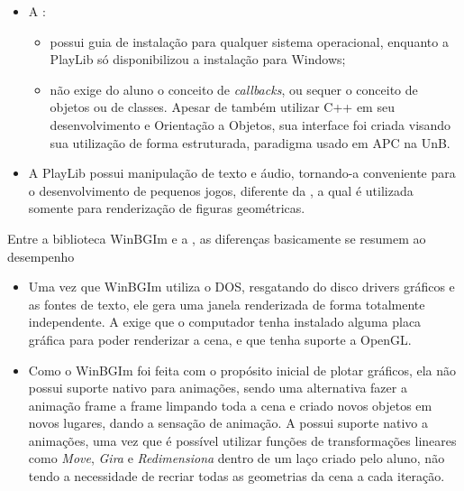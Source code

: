  \begin{itemize}
    \item A \playAPC:
    \begin{itemize}
        \item possui guia  de instalação  para qualquer  sistema
   operacional, enquanto a PlayLib  só disponibilizou a instalação para
   Windows;
        \item não exige  do aluno o conceito de \emph{callbacks},
    ou sequer o  conceito de  objetos ou de classes. Apesar  de também
    utilizar C++  em seu  desenvolvimento e  Orientação a  Objetos, sua
    interface foi  criada visando sua utilização  de forma estruturada,
    paradigma usado em \acrshort{APC} na \textsf{UnB}.
    \end{itemize}
 \item  A  PlayLib possui  manipulação  de  texto  e áudio,  tornando-a
   conveniente para  o desenvolvimento de pequenos  jogos, diferente da
   \playAPC{}, a  qual é utilizada somente para  renderização de figuras
   geométricas.
 \end{itemize}

 Entre a biblioteca WinBGIm e a \playAPC, as diferenças basicamente se resumem ao desempenho
 \begin{itemize}
 \item Uma vez que WinBGIm utiliza o DOS, resgatando do disco drivers gráficos e as fontes de texto, ele gera uma janela renderizada de forma totalmente independente. A \playAPC{} exige que o computador tenha instalado alguma placa gráfica para poder renderizar a cena, e que tenha suporte a OpenGL.
 \item Como o WinBGIm foi feita com o propósito inicial de plotar gráficos, ela não possui suporte nativo para animações, sendo uma alternativa fazer a animação frame a frame limpando toda a cena e criado novos objetos em novos lugares, dando a sensação de animação. A \playAPC{} possui suporte nativo a animações, uma vez que é possível utilizar funções de transformações lineares como \emph{Move}, \emph{Gira} e \emph{Redimensiona} dentro de um laço criado pelo aluno, não tendo a necessidade de recriar todas as geometrias da cena a cada iteração.

 \end{itemize}

